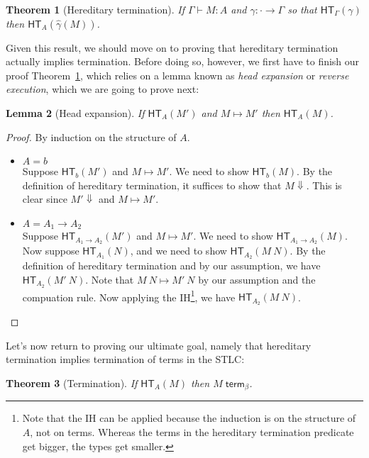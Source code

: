 \documentclass{article}
\newtheorem{thm}{Theorem}
\newtheorem{lem}[thm]{Lemma}
\newcommand{\hasEF}[3]{\ensuremath{#1 \vdash #2 : #3}}
\newcommand{\hterm}[2]{\ensuremath{\mathsf{HT}_{#1}(#2)}}
\newcommand{\termb}[1]{\ensuremath{{#1} \; \mathsf{term}_{\beta}}}
\newcommand{\step}[2]{\ensuremath{#1 \mapsto #2}}
\newcommand{\fn}[2]{\ensuremath{#1 \to #2}}
\newcommand{\ap}[2]{\ensuremath{#1\ #2}}
\begin{document}
\begin{thm}[Hereditary termination]\label{thm:hterm}
  If $\hasEF{\Gamma}{M}{A}$ and $\gamma : \cdot \to \Gamma$ so that
  $\hterm{\Gamma}{\gamma}$ then $\hterm{A}{\hat{\gamma}(M)}$.
\end{thm}

Given this result, we should move on to proving that hereditary termination actually implies
termination.  Before doing so, however, we first have to finish our proof
Theorem~\ref{thm:hterm}, which relies on a lemma known as \emph{head expansion} or
\emph{reverse execution}, which we are going to prove next:

\begin{lem}[Head expansion]\label{lem:hexp}
  If $\hterm{A}{M'}$ and $\step{M}{M'}$ then $\hterm{A}{M}$.
\end{lem}

\begin{proof}
  By induction on the structure of $A$.
  \begin{itemize}
  \setlength\itemsep{1em}
  \item $A = b$\\
    Suppose $\hterm{b}{M'}$ and $\step{M}{M'}$. We need to show $\hterm{b}{M}$. By the
    definition of hereditary termination, it suffices to show that $M \Downarrow$. 
    This is clear since $M' \Downarrow$ and $\step{M}{M'}$.
  \item $A = \fn{A_1}{A_2}$\\
    Suppose $\hterm{\fn{A_1}{A_2}}{M'}$ and $\step{M}{M'}$. We need to show $\hterm{\fn{A_1}{A_2}}{M}$.
    Now suppose $\hterm{A_1}{N}$, and we need to show $\hterm{A_2}{\ap{M}{N}}$. 
    By the definition of hereditary termination and by our assumption, we have $\hterm{A_2}{\ap{M'}{N}}$. 
    Note that $\step{\ap{M}{N}}{\ap{M'}{N}}$ by our assumption and the compuation rule.
    Now applying the IH\footnote{Note that the IH can be applied because the induction is on
      the structure of $A$, not on terms.  Whereas the terms in the hereditary termination
      predicate get bigger, the types get smaller.}, we have $\hterm{A_2}{\ap{M}{N}}$.
    \qedhere
  \end{itemize}
\end{proof}

Let's now return to proving our ultimate goal, namely that hereditary termination implies termination of terms in the STLC:

\begin{thm}[Termination]\label{thm:term}
  If $\hterm{A}{M}$ then $\termb{M}$.
\end{thm}
\end{document}
